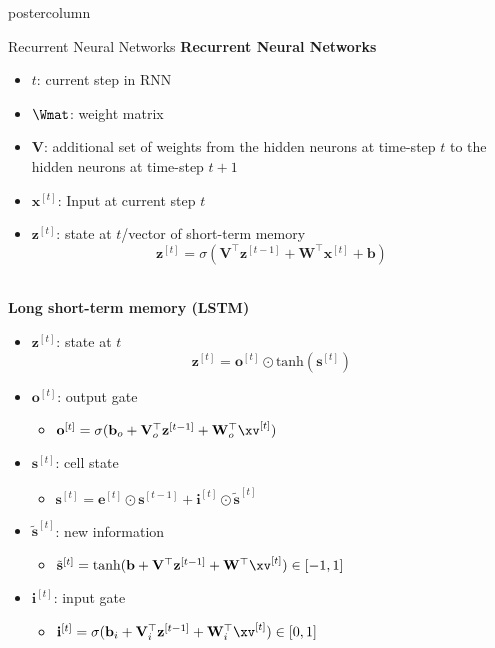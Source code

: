 \documentclass{beamer}
\begin{document}
\begin{frame}[fragile]{}
\begin{columns}
\begin{column}{.31\textwidth}
\begin{beamercolorbox}[center]{postercolumn}
\begin{minipage}{.98\textwidth}
{\begin{myblock}{Recurrent Neural Networks}
\textbf{Recurrent Neural Networks}
\begin{itemize}
\item[] $t$: current step in RNN
\item[] $\Wmat$: weight matrix 
\item[] $\mathbf{V}$: additional set of weights from the hidden neurons at time-step $t$ to the hidden neurons at time-step $t+1$
\item[] $\mathbf{x}^{[t]}$: Input at current step $t$
\item[] $\mathbf{z}^{[t]}$: state at $t$/vector of short-term memory 
$$\mathbf{z}^{[t]} = \sigma(\mathbf{V}^\top\mathbf{z}^{[t-1]} + \mathbf{W}^\top \mathbf{x}^{[t]} + \mathbf{b})$$
\end{itemize}
\ \\
\textbf{Long short-term memory (LSTM)}
\begin{itemize}
\item[] $\mathbf{z}^{[t]}$: state at $t$
$$\mathbf{z}^{[t]} = \mathbf{o}^{[t]} \odot \text{tanh}(\mathbf{s}^{[t]})$$
\item[] $\mathbf{o}^{[t]}$: output gate
\begin{itemize} \normalsize
\item[]$\mathbf{o}^{[t]} = \sigma(\mathbf{b}_o + \mathbf{V}_o^\top \mathbf{z}^{[t-1]} + \mathbf{W}_o^\top \xv^{[t]})$
\end{itemize}
\item[] $\mathbf{s}^{[t]}$: cell state 
\begin{itemize} \normalsize
\item[]$\mathbf{s}^{[t]} = \mathbf{e}^{[t]} \odot \mathbf{s}^{[t-1]} + \mathbf{i}^{[t]} \odot \tilde{\mathbf{s}}^{[t]}$
\end{itemize}
\item[] $\tilde{\mathbf{s}}^{[t]}$: new information 
\begin{itemize} \normalsize
\item[]$\tilde{\mathbf{s}}^{[t]} = \text{tanh}(\mathbf{b} + \mathbf{V}^\top \mathbf{z}^{[t-1]} + \mathbf{W}^\top \xv^{[t]}) \in [-1, 1]$
\end{itemize}
\item[] $\mathbf{i}^{[t]}$: input gate 
\begin{itemize} \normalsize
\item[]$\mathbf{i}^{[t]} = \sigma(\mathbf{b}_i + \mathbf{V}_i^\top \mathbf{z}^{[t-1]} + \mathbf{W}_i^\top \xv^{[t]}) \in [0,1]$
\end{itemize}

\end{itemize}
\end{myblock}}
\end{minipage}
\end{beamercolorbox}
\end{column}
\end{columns}
\end{frame}
\end{document}
